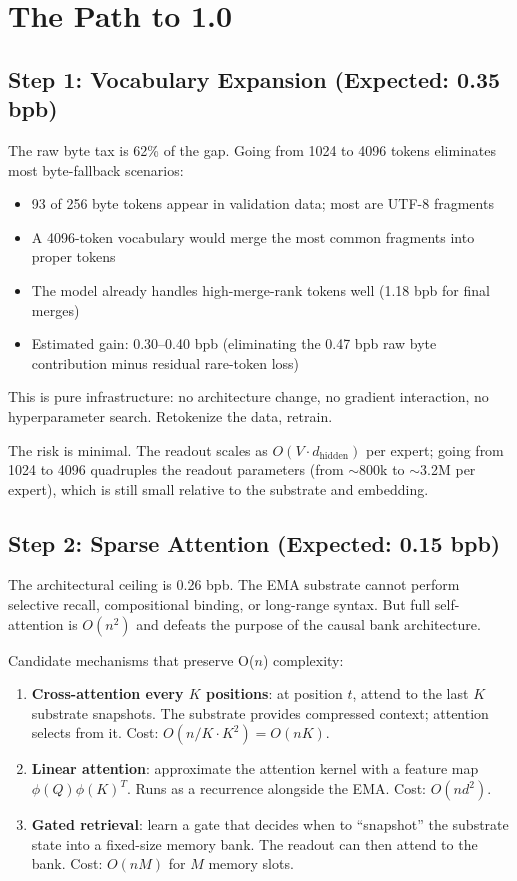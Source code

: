 \documentclass[11pt,a4paper]{report}
\begin{document}
\chapter{The Path to 1.0}

\section{Step 1: Vocabulary Expansion (Expected: 0.35 bpb)}

The raw byte tax is 62\% of the gap. Going from 1024 to 4096 tokens eliminates most byte-fallback scenarios:

\begin{itemize}[nosep]
\item 93 of 256 byte tokens appear in validation data; most are UTF-8 fragments
\item A 4096-token vocabulary would merge the most common fragments into proper tokens
\item The model already handles high-merge-rank tokens well (1.18 bpb for final merges)
\item Estimated gain: 0.30--0.40 bpb (eliminating the 0.47 bpb raw byte contribution minus residual rare-token loss)
\end{itemize}

This is pure infrastructure: no architecture change, no gradient interaction, no hyperparameter search. Retokenize the data, retrain.

The risk is minimal. The readout scales as $O(V \cdot d_{\text{hidden}})$ per expert; going from 1024 to 4096 quadruples the readout parameters (from $\sim$800k to $\sim$3.2M per expert), which is still small relative to the substrate and embedding.

\section{Step 2: Sparse Attention (Expected: 0.15 bpb)}

The architectural ceiling is 0.26 bpb. The EMA substrate cannot perform selective recall, compositional binding, or long-range syntax. But full self-attention is $O(n^2)$ and defeats the purpose of the causal bank architecture.

Candidate mechanisms that preserve O($n$) complexity:

\begin{enumerate}
\item \textbf{Cross-attention every $K$ positions}: at position $t$, attend to the last $K$ substrate snapshots. The substrate provides compressed context; attention selects from it. Cost: $O(n/K \cdot K^2) = O(nK)$.
\item \textbf{Linear attention}: approximate the attention kernel with a feature map $\phi(Q)\phi(K)^T$. Runs as a recurrence alongside the EMA. Cost: $O(nd^2)$.
\item \textbf{Gated retrieval}: learn a gate that decides when to ``snapshot'' the substrate state into a fixed-size memory bank. The readout can then attend to the bank. Cost: $O(nM)$ for $M$ memory slots.
\end{enumerate}
\end{document}
